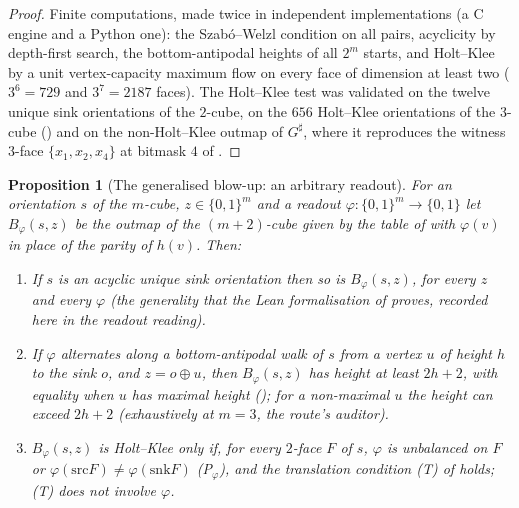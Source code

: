 \documentclass[11pt]{article}
\theoremstyle{plain}
\newtheorem{proposition}[theorem]{Proposition}
\theoremstyle{definition}
\begin{document}
\begin{proof}
Finite computations, made twice in independent implementations (a C engine
and a Python one): the Szab\'o--Welzl condition on all pairs, acyclicity by
depth-first search, the bottom-antipodal heights of all $2^{m}$ starts,
and Holt--Klee by a unit vertex-capacity maximum flow on every face of
dimension at least two ($3^{6}=729$ and $3^{7}=2187$ faces). The
Holt--Klee test was validated on the twelve unique sink orientations of the
$2$-cube, on the $656$ Holt--Klee orientations of the $3$-cube
() and on the non-Holt--Klee outmap of
$G^{\sharp}$, where it reproduces the witness $3$-face
$\{x_1,x_2,x_4\}$ at bitmask $4$ of .
\end{proof}

\begin{proposition}[The generalised blow-up: an arbitrary readout]\label{prop:blowup-readout}
For an orientation $s$ of the $m$-cube, $z\in\{0,1\}^{m}$ and a
\emph{readout} $\varphi:\{0,1\}^{m}\to\{0,1\}$ let $B_\varphi(s,z)$ be the
outmap of the $(m+2)$-cube given by the table of  with
$\varphi(v)$ in place of the parity of $h(v)$. Then:
\begin{enumerate}
\item[(a)] If $s$ is an acyclic unique sink orientation then so is
$B_\varphi(s,z)$, for \emph{every} $z$ and every $\varphi$ (the
generality that the Lean formalisation of  proves,
recorded here in the readout reading).
\item[(b)] If $\varphi$ alternates along a bottom-antipodal walk of $s$
from a vertex $u$ of height $h$ to the sink $o$, and $z=o\oplus u$, then
$B_\varphi(s,z)$ has height at least $2h+2$, with equality when $u$ has
maximal height (); for a non-maximal $u$ the
height can exceed $2h+2$ (exhaustively at $m=3$, the route's auditor).
\item[(c)] $B_\varphi(s,z)$ is Holt--Klee only if, for every $2$-face $F$
of $s$, $\varphi$ is unbalanced on $F$ or $\varphi(\mathrm{src}F)\ne
\varphi(\mathrm{snk}F)$ \emph{(P$_\varphi$)}, and the translation
condition \emph{(T)} of  holds; \emph{(T)} does not
involve $\varphi$.
\end{enumerate}
\end{proposition}
\end{document}
